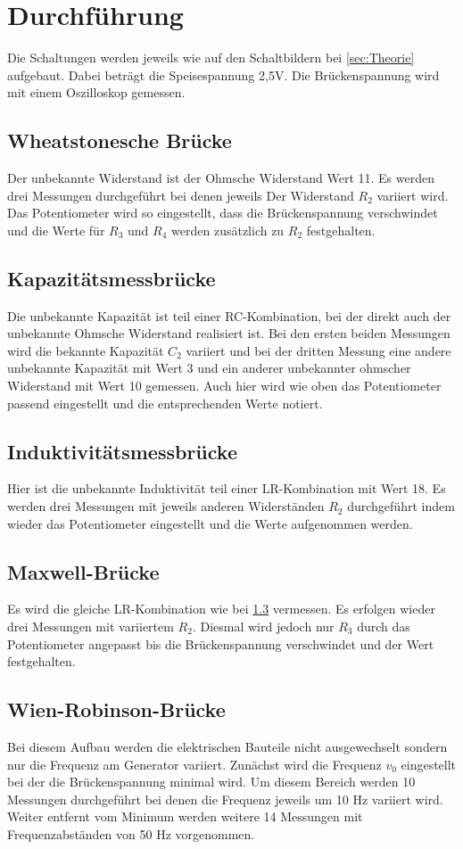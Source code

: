 \section{Durchführung}
\label{sec:Durchführung}
Die Schaltungen werden jeweils wie auf den Schaltbildern bei 
\ref{sec:Theorie} aufgebaut. Dabei beträgt die
Speisespannung 2,5V. Die Brückenspannung wird
mit einem Oszilloskop gemessen.
\subsection{Wheatstonesche Brücke}
Der unbekannte Widerstand ist der Ohmsche Widerstand Wert 11.
Es werden drei Messungen durchgeführt bei denen jeweils Der Widerstand $R_2$
variiert wird. Das Potentiometer wird so eingestellt,
dass die Brückenspannung verschwindet und die Werte
für $R_3$ und $R_4$ werden zusätzlich zu $R_2$ festgehalten.
\subsection{Kapazitätsmessbrücke}
Die unbekannte Kapazität ist teil einer RC-Kombination,
bei der direkt auch der unbekannte Ohmsche Widerstand realisiert ist.
Bei den ersten beiden Messungen wird die bekannte Kapazität $C_2$ variiert
und bei der dritten Messung eine andere unbekannte Kapazität mit Wert 3
und ein anderer unbekannter ohmscher Widerstand mit Wert 10 gemessen.
Auch hier wird wie oben das Potentiometer passend eingestellt und die
entsprechenden Werte notiert.
\subsection{Induktivitätsmessbrücke}
\label{sec:Indu}
Hier ist die unbekannte Induktivität teil einer LR-Kombination
mit Wert 18. Es werden drei Messungen mit jeweils anderen Widerständen $R_2$
durchgeführt indem wieder das Potentiometer eingestellt und die Werte aufgenommen werden.
\subsection{Maxwell-Brücke}
Es wird die gleiche LR-Kombination wie bei \ref{sec:Indu} vermessen.
Es erfolgen wieder drei Messungen mit variiertem $R_2$. Diesmal
wird jedoch nur $R_3$ durch das Potentiometer angepasst bis die
Brückenspannung verschwindet und der Wert festgehalten.

\subsection{Wien-Robinson-Brücke}
Bei diesem Aufbau werden die elektrischen Bauteile
nicht ausgewechselt sondern nur die Frequenz am 
Generator variiert. Zunächst wird die Frequenz $v_0$ eingestellt
bei der die Brückenspannung minimal wird. Um diesem Bereich werden
10 Messungen durchgeführt bei denen die Frequenz jeweils um 10 Hz
variiert wird. Weiter entfernt vom Minimum werden weitere 14 Messungen
mit Frequenzabständen von 50 Hz vorgenommen.